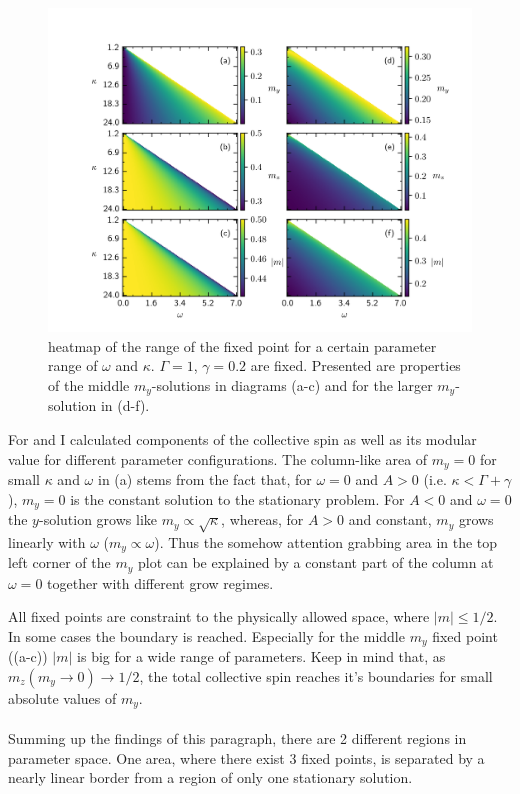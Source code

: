 \begin{figure}[H]
    \vspace*{-0.8cm}
    \hspace*{-1cm}
    \includegraphics{pictures/fixp_bound_heatmap_ml2.png}
    \caption{heatmap of the range of the fixed point for a certain parameter range of $\omega$ and $\kappa$. $\Gamma=1$, $\gamma=0.2$ are fixed. Presented are properties of the middle $m_y$-solutions in diagrams (a-c) and for the larger $m_y$-solution in (d-f).}
    \label{fig:fixp_midlarge_bound_hm}
\end{figure}
For  and  I calculated components of the collective spin as well as its modular value for different parameter configurations.
The column-like area of $m_y=0$ for small $\kappa$ and $\omega$ in (a) stems from the fact that, for $\omega=0$ and $A>0$ (i.e. $\kappa<\Gamma+\gamma$), $m_y=0$ is the constant solution to the stationary problem. For $A<0$ and $\omega=0$ the $y$-solution grows like $m_y\propto\sqrt{\kappa}$, whereas, for $A>0$ and constant, $m_y$ grows linearly with $\omega$ ($m_y\propto\omega$). Thus the somehow attention grabbing area in the top left corner of the $m_y$ plot can be explained by a constant part of the column at $\omega=0$ together with different grow regimes.

All fixed points are constraint to the physically allowed space, where $|m|\leq1/2$. In some cases the boundary is reached. Especially for the middle $m_y$ fixed point ((a-c)) $|m|$ is big for a wide range of parameters. Keep in mind that, as $m_z(m_y\rightarrow0)\rightarrow1/2$, the total collective spin reaches it's boundaries for small absolute values of $m_y$.\\\\
Summing up the findings of this paragraph, there are 2 different regions in parameter space. One area, where there exist 3 fixed points, is separated by a nearly linear border from a region of only one stationary solution.


